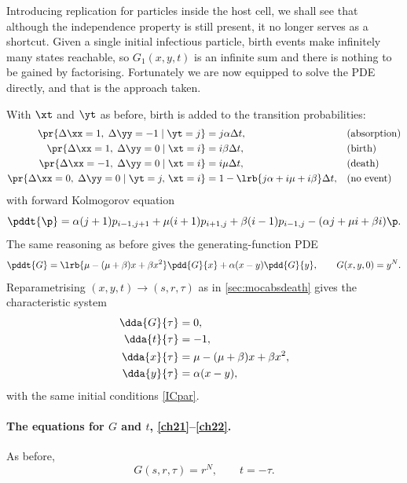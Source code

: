 Introducing replication for particles inside the host cell, we shall see that although
the independence property is still present, it no longer serves as a shortcut. Given a
single initial infectious particle, birth events make infinitely many states reachable,
so $G_1(x,y,t)$ is an infinite sum and there is nothing to be gained by factorising.
Fortunately we are now equipped to solve the PDE directly, and that is the approach
taken.

With $\xt$ and $\yt$ as before, birth is added to the transition probabilities:
\begin{align*}
     \pr{\Delta\xx= 1,\;\Delta\yy = -1 \;|\; \yt = j} &= j \alpha \Delta t,  &&\text{(absorption)}\\
     \pr{\Delta\xx= 1,\;\Delta\yy = 0 \;|\; \xt = i} &= i \beta \Delta t,  &&\text{(birth)}\\
      \pr{\Delta\xx= -1,\;\Delta\yy = 0 \;|\; \xt = i} &= i \mu \Delta t,  &&\text{(death)}\\
     \pr{\Delta\xx= 0,\;\Delta\yy = 0 \;|\; \yt = j,\, \xt=i} &= 1 -  \lrb{ j\alpha + i\mu + i\beta}\Delta t,  &&\text{(no event)}
\end{align*}
with forward Kolmogorov equation
\begin{equation}
\label{FK3}
\pddt{\p} = \alpha(j+1)p_{i-1,j+1} + \mu(i+1)p_{i+1,j} + \beta(i-1)p_{i-1,j} - (\alpha j + \mu i + \beta i)\p .
\end{equation}
The same reasoning as before gives the generating-function PDE
\begin{equation}
\label{PDE3}
\pddt{G} = \lrb{\mu - (\mu+\beta)x + \beta x^2}\pdd{G}{x} + \alpha(x-y)\pdd{G}{y},
\qquad G(x,y,0) = y^N .
\end{equation}
Reparametrising $(x,y,t)\to(s,r,\tau)$ as in \cref{sec:mocabsdeath} gives the
characteristic system
\begin{align}
\dda{G}{\tau} &= 0, \label{ch21}\\
\dda{t}{\tau} &= -1, \label{ch22}\\
\dda{x}{\tau} &= \mu-(\mu+\beta)x + \beta x^2, \label{ch23}\\
\dda{y}{\tau} &= \alpha(x-y), \label{ch24}
\end{align}
with the same initial conditions \cref{ICpar}.

\paragraph{The equations for $G$ and $t$, \eqref{ch21}--\eqref{ch22}.}
As before,
\begin{equation}
\label{gngngn}
G(s,r,\tau) = r^N,
\qquad t = -\tau .
\end{equation}

